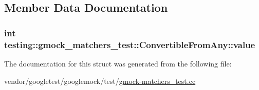 \subsection{Member Data Documentation}
\subsubsection[{\texorpdfstring{value}{value}}]{\setlength{\rightskip}{0pt plus 5cm}int testing\+::gmock\+\_\+matchers\+\_\+test\+::\+Convertible\+From\+Any\+::value}\hypertarget{structtesting_1_1gmock__matchers__test_1_1ConvertibleFromAny_a7d18bc7eb4d6eaae32d581e7c204f917}{}\label{structtesting_1_1gmock__matchers__test_1_1ConvertibleFromAny_a7d18bc7eb4d6eaae32d581e7c204f917}


The documentation for this struct was generated from the following file\+:\begin{DoxyCompactItemize}
\item 
vendor/googletest/googlemock/test/\hyperlink{gmock-matchers__test_8cc}{gmock-\/matchers\+\_\+test.\+cc}\end{DoxyCompactItemize}

